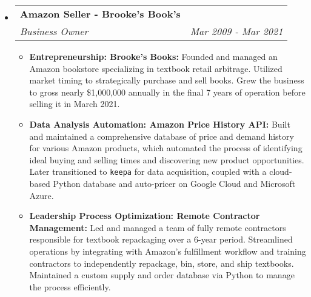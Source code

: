 \documentclass[letterpaper,11pt]{article}
\makeatletter
\newcommand{\resitem}[1]{\item #1 \vspace{-2pt}}
\newcommand{\ressubheading}[4]{
\begin{tabular*}{7.0in}{l@{\extracolsep{\fill}}r}
		\textbf{#1} & #2 \\
		\textit{#3} & \textit{#4} \\
\end{tabular*}\vspace{-6pt}}
\makeatother
\begin{document}
\begin{itemize}
\item
  \ressubheading{Amazon Seller - Brooke's Book's}{}{Business Owner}{Mar 2009 - Mar 2021}
  \begin{itemize}
    \resitem{\textbf{Entrepreneurship: Brooke's Books:} Founded and managed an Amazon bookstore specializing in textbook retail arbitrage. Utilized market timing to strategically purchase and sell books. Grew the business to gross nearly \$1,000,000 annually in the final 7 years of operation before selling it in March 2021.}
    \resitem{\textbf{Data Analysis  Automation: Amazon Price History API:} Built and maintained a comprehensive database of price and demand history for various Amazon products, which automated the process of identifying ideal buying and selling times and discovering new product opportunities. Later transitioned to \texttt{keepa} for data acquisition, coupled with a cloud-based Python database and auto-pricer on Google Cloud and Microsoft Azure.}
    \resitem{\textbf{Leadership  Process Optimization: Remote Contractor Management:} Led and managed a team of fully remote contractors responsible for textbook repackaging over a 6-year period. Streamlined operations by integrating with Amazon's fulfillment workflow and training contractors to independently repackage, bin, store, and ship textbooks. Maintained a custom supply and order database via Python to manage the process efficiently.}
  \end{itemize}


\end{itemize}
\end{document}
